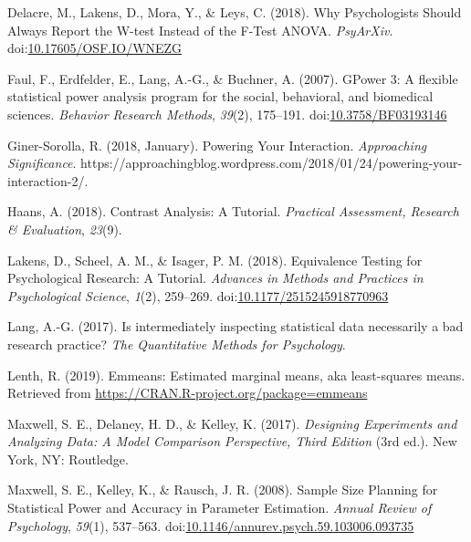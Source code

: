 \documentclass[
  ,jou,floatsintext]{apa6}
\begin{document}
\leavevmode\hypertarget{ref-delacre_why_2018}{}%
Delacre, M., Lakens, D., Mora, Y., \& Leys, C. (2018). Why Psychologists Should Always Report the W-test Instead of the F-Test ANOVA. \emph{PsyArXiv}. doi:\href{https://doi.org/10.17605/OSF.IO/WNEZG}{10.17605/OSF.IO/WNEZG}

\leavevmode\hypertarget{ref-faul_gpower_2007}{}%
Faul, F., Erdfelder, E., Lang, A.-G., \& Buchner, A. (2007). GPower 3: A flexible statistical power analysis program for the social, behavioral, and biomedical sciences. \emph{Behavior Research Methods}, \emph{39}(2), 175--191. doi:\href{https://doi.org/10.3758/BF03193146}{10.3758/BF03193146}

\leavevmode\hypertarget{ref-giner-sorolla_powering_2018}{}%
Giner-Sorolla, R. (2018, January). Powering Your Interaction. \emph{Approaching Significance}. https://approachingblog.wordpress.com/2018/01/24/powering-your-interaction-2/.

\leavevmode\hypertarget{ref-haans_contrast_2018}{}%
Haans, A. (2018). Contrast Analysis: A Tutorial. \emph{Practical Assessment, Research \& Evaluation}, \emph{23}(9).

\leavevmode\hypertarget{ref-lakens_equivalence_2018}{}%
Lakens, D., Scheel, A. M., \& Isager, P. M. (2018). Equivalence Testing for Psychological Research: A Tutorial. \emph{Advances in Methods and Practices in Psychological Science}, \emph{1}(2), 259--269. doi:\href{https://doi.org/10.1177/2515245918770963}{10.1177/2515245918770963}

\leavevmode\hypertarget{ref-lang2017intermediately}{}%
Lang, A.-G. (2017). Is intermediately inspecting statistical data necessarily a bad research practice? \emph{The Quantitative Methods for Psychology}.

\leavevmode\hypertarget{ref-lenthemmeans}{}%
Lenth, R. (2019). Emmeans: Estimated marginal means, aka least-squares means. Retrieved from \url{https://CRAN.R-project.org/package=emmeans}

\leavevmode\hypertarget{ref-maxwell_designing_2017}{}%
Maxwell, S. E., Delaney, H. D., \& Kelley, K. (2017). \emph{Designing Experiments and Analyzing Data: A Model Comparison Perspective, Third Edition} (3rd ed.). New York, NY: Routledge.

\leavevmode\hypertarget{ref-maxwell_sample_2008}{}%
Maxwell, S. E., Kelley, K., \& Rausch, J. R. (2008). Sample Size Planning for Statistical Power and Accuracy in Parameter Estimation. \emph{Annual Review of Psychology}, \emph{59}(1), 537--563. doi:\href{https://doi.org/10.1146/annurev.psych.59.103006.093735}{10.1146/annurev.psych.59.103006.093735}
\end{document}
